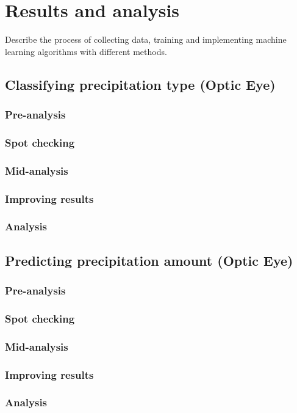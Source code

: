 \chapter{Results and analysis}
Describe the process of collecting data, training and implementing machine learning algorithms with different methods.

\section{Classifying precipitation type (Optic Eye)}
	\subsection{Pre-analysis}
	\subsection{Spot checking}
	\subsection{Mid-analysis}
	\subsection{Improving results}
	\subsection{Analysis}
\section{Predicting precipitation amount (Optic Eye)}
	\subsection{Pre-analysis}
	\subsection{Spot checking}
	\subsection{Mid-analysis}
	\subsection{Improving results}
	\subsection{Analysis}
